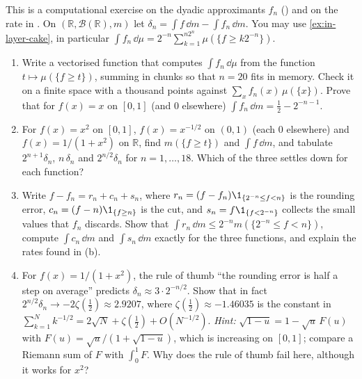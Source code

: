 \begin{exercise}\label{ex:in-dyadic-rates}
\medium This is a computational exercise on the dyadic approximants $f_n$
() and on the rate in . On
$(\mathbb R,\mathcal B(\mathbb R),m)$ let $\delta_n=\int f\,\dd m-\int f_n\,\dd m$. You may use
\cref{ex:in-layer-cake}, in particular
$\int f_n\,\dd\mu=2^{-n}\sum_{k=1}^{n2^n}\mu(\{f\ge k2^{-n}\})$.
\begin{enumerate}[label=(\alph*)]
  \item Write a vectorised function that computes $\int f_n\,\dd\mu$ from the function
    $t\mapsto\mu(\{f\ge t\})$, summing in chunks so that $n=20$ fits in memory. Check it on a
    finite space with a thousand points against $\sum_xf_n(x)\,\mu(\{x\})$. Prove that for
    $f(x)=x$ on $[0,1]$ (and $0$ elsewhere) $\int f_n\,\dd m=\frac12-2^{-n-1}$.
  \item For $f(x)=x^2$ on $[0,1]$, $f(x)=x^{-1/2}$ on $(0,1)$ (each $0$ elsewhere) and
    $f(x)=1/(1+x^2)$ on $\mathbb R$, find $m(\{f\ge t\})$ and $\int f\,\dd m$, and tabulate
    $2^{n+1}\delta_n$, $n\,\delta_n$ and $2^{n/2}\delta_n$ for $n=1,\dots,18$. Which of the three
    settles down for each function?
  \item Write $f-f_n=r_n+c_n+s_n$, where $r_n=(f-f_n)\1_{\{2^{-n}\le f<n\}}$ is the rounding
    error, $c_n=(f-n)\1_{\{f\ge n\}}$ is the cut, and $s_n=f\1_{\{f<2^{-n}\}}$ collects the small
    values that $f_n$ discards. Show that $\int r_n\,\dd m\le2^{-n}m(\{2^{-n}\le f<n\})$, compute
    $\int c_n\,\dd m$ and $\int s_n\,\dd m$ exactly for the three functions, and explain the rates
    found in (b).
  \item For $f(x)=1/(1+x^2)$, the rule of thumb ``the rounding error is half a step on average''
    predicts $\delta_n\approx3\cdot2^{-n/2}$. Show that in fact
    $2^{n/2}\delta_n\to-2\zeta(\frac12)\approx2.9207$, where $\zeta(\frac12)\approx-1.46035$ is the
    constant in $\sum_{k=1}^Nk^{-1/2}=2\sqrt N+\zeta(\frac12)+O(N^{-1/2})$. \emph{Hint:}
    $\sqrt{1-u}=1-\sqrt u\,F(u)$ with $F(u)=\sqrt u/(1+\sqrt{1-u})$, which is increasing on
    $[0,1]$; compare a Riemann sum of $F$ with $\int_0^1F$. Why does the rule of thumb fail here,
    although it works for $x^2$?
\end{enumerate}
\end{exercise}

